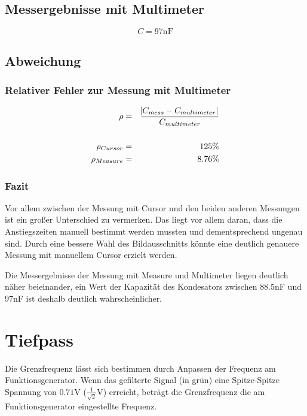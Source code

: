\documentclass[10pt]{report}
\begin{document}
      \subsection{Messergebnisse mit Multimeter}
      \begin{equation*}
          C = 97\text{nF}
      \end{equation*}

      \subsection{Abweichung}
      \subsubsection{Relativer Fehler zur Messung mit Multimeter}
      \begin{eqnarray*}
          \rho &=& \frac{\abs{C_{mess} - C_{multimeter}}}{C_{multimeter}}\\
          \\
          \rho_{Cursor} &=& 125\% \\
          \rho_{Measure} &=& 8.76\%
      \end{eqnarray*}

      \subsubsection{Fazit}
      Vor allem zwischen der Messung mit Cursor und den beiden anderen Messungen
      ist ein großer Unterschied zu vermerken. Das liegt vor allem daran, dass die
      Anstiegszeiten manuell bestimmt werden mussten und dementsprechend ungenau sind.
      Durch eine bessere Wahl des Bildausschnitts könnte eine deutlich genauere
      Messung mit manuellem Cursor erzielt werden.

      Die Messergebnisse der Messung mit Measure und Multimeter liegen deutlich
      näher beieinander, ein Wert der Kapazität des Kondesators zwischen
      $88.5$nF und $97$nF ist deshalb deutlich wahrscheinlicher.


      \section{Tiefpass}
      Die Grenzfrequenz lässt sich bestimmen durch Anpassen der Frequenz
      am Funktionsgenerator. Wenn das gefilterte Signal (in grün)
      eine Spitze-Spitze Spannung von $0.71$V ($\frac{1}{\sqrt{2}}$V) erreicht,
      beträgt die Grenzfrequenz die am Funktionsgenerator eingestellte Frequenz.
\end{document}
